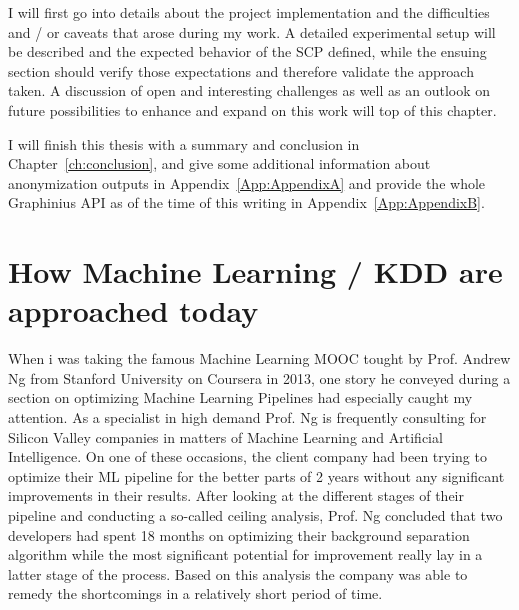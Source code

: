 I will first go into details about the project implementation and the difficulties and / or caveats that arose during my work. A detailed experimental setup will be described and the expected behavior of the SCP defined, while the ensuing section should verify those expectations and therefore validate the approach taken. A discussion of open and interesting challenges as well as  an outlook on future possibilities to enhance and expand on this work will top of this chapter.




I will finish this thesis with a summary and conclusion in Chapter~\ref{ch:conclusion}, and give some additional information about anonymization outputs in Appendix~\ref{App:AppendixA} and provide the whole Graphinius API as of the time of this writing in Appendix~\ref{App:AppendixB}.


\section{How Machine Learning / KDD are approached today}
\label{sect:ml_kdd_today}

When i was taking the famous Machine Learning MOOC tought by Prof. Andrew Ng from Stanford University on Coursera in 2013, one story he conveyed during a section on optimizing Machine Learning Pipelines had especially caught my attention. As a specialist in high demand Prof. Ng is frequently consulting for Silicon Valley companies in matters of Machine Learning and Artificial Intelligence. On one of these occasions, the client company had been trying to optimize their ML pipeline for the better parts of 2 years without any significant improvements in their results. After looking at the different stages of their pipeline and conducting a so-called ceiling analysis, Prof. Ng concluded that two developers had spent 18 months on optimizing their background separation algorithm while the most significant potential for improvement really lay in a latter stage of the process. Based on this analysis the company was able to remedy the shortcomings in a relatively short period of time.

